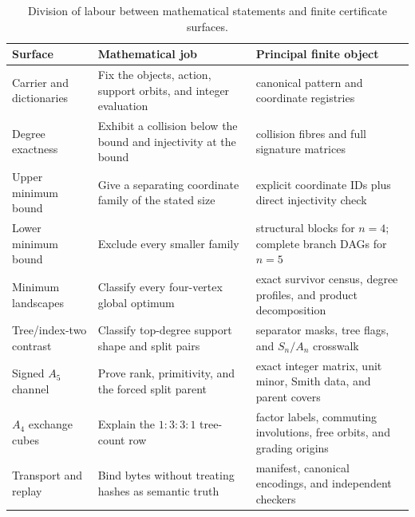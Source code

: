 \begin{table}[H]
\centering
\caption{Division of labour between mathematical statements and finite
certificate surfaces.}
\label{tab:certificate-inventory}
\begin{tabularx}{\textwidth}{>{\raggedright\arraybackslash}p{}>{\raggedright\arraybackslash}X>{\raggedright\arraybackslash}p{}}
\toprule
Surface & Mathematical job & Principal finite object\\
\midrule
Carrier and dictionaries & Fix the objects, action, support orbits, and integer evaluation & canonical pattern and coordinate registries\\
Degree exactness & Exhibit a collision below the bound and injectivity at the bound & collision fibres and full signature matrices\\
Upper minimum bound & Give a separating coordinate family of the stated size & explicit coordinate IDs plus direct injectivity check\\
Lower minimum bound & Exclude every smaller family & structural blocks for $n=4$; complete branch DAGs for $n=5$\\
Minimum landscapes & Classify every four-vertex global optimum & exact survivor census, degree profiles, and product decomposition\\
Tree/index-two contrast & Classify top-degree support shape and split pairs & separator masks, tree flags, and $S_n/A_n$ crosswalk\\
Signed $A_5$ channel & Prove rank, primitivity, and the forced split parent & exact integer matrix, unit minor, Smith data, and parent covers\\
$A_4$ exchange cubes & Explain the $1:3:3:1$ tree-count row & factor labels, commuting involutions, free orbits, and grading origins\\
Transport and replay & Bind bytes without treating hashes as semantic truth & manifest, canonical encodings, and independent checkers\\
\bottomrule
\end{tabularx}
\end{table}
